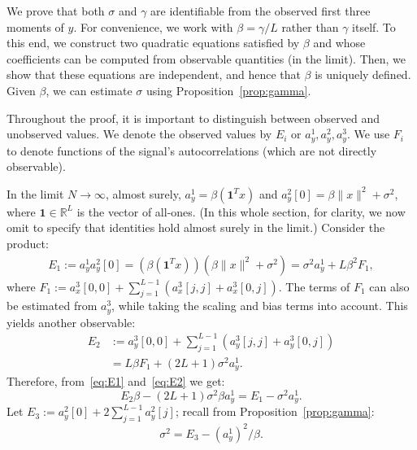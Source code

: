 \documentclass[12pt]{article}
\newcommand{\1}{\mathbf{1}}
\newcommand{\RL}{\mathbb{R}^L}
\newcommand{\one}{\mathbf{1}}
\theoremstyle{plain}
\theoremstyle{definition}
\theoremstyle{remark}
\theoremstyle{plain}
\theoremstyle{remark}
\theoremstyle{plain}
\theoremstyle{plain}
\theoremstyle{plain}
\numberwithin{equation}{section}
\begin{document}
We prove that both $\sigma$ and $\gamma$ are identifiable from the observed first three moments of $y$. For convenience, we work with $\beta = \gamma / L$ rather than $\gamma$ itself. To this end, we construct two quadratic equations satisfied by $\beta$ and whose coefficients can be computed from observable quantities (in the limit). Then, we show that these equations are independent, and hence that $\beta$ is uniquely defined. Given $\beta$, we can estimate $\sigma$ using Proposition~\ref{prop:gamma}.

Throughout the proof, it is important to distinguish between observed and unobserved values.
We denote the observed values by $E_i$ or $a_y^1,a_y^2,a_y^3$. We use $F_i$ to denote functions of the signal's autocorrelations (which are not directly observable).

In the limit $N \to \infty$, almost surely, $a_y^1 = \beta(\one^Tx)$ and $a_y^2[0] = \beta\|x\|^2+\sigma^2$, where $\one\in\RL$ is the vector of all-ones. (In this whole section, for clarity, we now omit to specify that identities hold almost surely in the limit.) Consider the product:
\begin{equation}\label{eq:E1}
\begin{split}
E_1 := a_y^1a_y^2[0] =  (\beta(\one^Tx))(\beta\|x\|^2+\sigma^2)  = \sigma^2a_y^1 + L\beta^2F_1,
\end{split}
\end{equation}
where $F_1 := a_x^3[0,0] + \sum_{j=1}^{L-1}(a_x^3[j,j] + a_x^3[0,j])$. 
The terms of $F_1$ can also be estimated from $a_y^3$, while taking the scaling and bias terms into account. This yields another observable:
\begin{align} 
E_2 & := a_y^3[0,0] + \sum_{j=1}^{L-1}(a_y^3[j,j] + a_y^3[0,j]) \nonumber\\
& = L\beta F_1 + (2L+1)\sigma^2a_y^1. \label{eq:E2}
\end{align}
Therefore, from~\eqref{eq:E1} and~\eqref{eq:E2} we get:
\begin{equation} \label{eq:E12}
E_2\beta -(2L+1)\sigma^2\beta a_y^1 = E_1-\sigma^2a_y^1.
\end{equation}
Let $E_3:=a_y^2[0] + 2\sum_{j = 1}^{L-1}a_y^2[j]$; recall from Proposition~\ref{prop:gamma}:
\begin{equation} \label{eq:sigma2}
\sigma^2 = E_3 - (a^1_y)^2/\beta. 
\end{equation} 
\end{document}
